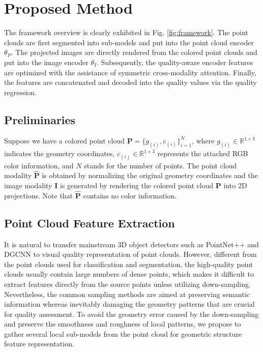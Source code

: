 \documentclass{article}
\begin{document}
\section{Proposed Method}
The framework overview is clearly exhibited in Fig. \ref{fig:framework}. The point clouds are first segmented into sub-models and put into the point cloud encoder $\theta_{P}$. The projected images are directly rendered from the colored point clouds and put into the image encoder $\theta_{I}$. Subsequently, the quality-aware encoder features are optimized with the assistance of symmetric cross-modality attention. Finally, the features are concatenated and decoded into the quality values via the quality regression. 

\subsection{Preliminaries} Suppose we have a colored point cloud $\mathbf{P} = \{g_{(i)} , c_{(i)} \}_{i=1}^{N}$, where $g_{(i)} \in \mathbb{R}^{1 \times 3} $ indicates the geometry coordinates, $c_{(i)} \in \mathbb{R}^{1 \times 3} $ represents the attached RGB color information, and $N$ stands for the number of points.  The point cloud modality $\mathbf{\hat{P}}$ is obtained by normalizing the original geometry coordinates and the image modality $\mathbf{I}$ is generated by rendering the colored point cloud $\mathbf{P}$ into 2D projections. Note that $\mathbf{\hat{P}}$ contains no color information. 





\subsection{Point Cloud Feature Extraction}
\label{sec:pc}
It is natural to transfer mainstream 3D object detectors such as PointNet++ \cite{qi2017pointnet++} and DGCNN \cite{wang2019dynamic} to visual quality representation of point clouds. However, different from the point clouds used for classification and segmentation, the high-quality point clouds usually contain large numbers of dense points, which makes it difficult to extract features directly from the source points unless utilizing down-sampling. Nevertheless, the common sampling methods are aimed at preserving semantic information whereas inevitably damaging the geometry patterns that are crucial for quality assessment. To avoid the geometry error caused by the down-sampling and preserve the smoothness and roughness of local patterns, we propose to gather several local sub-models from the point cloud for geometric structure feature representation. 
\end{document}
